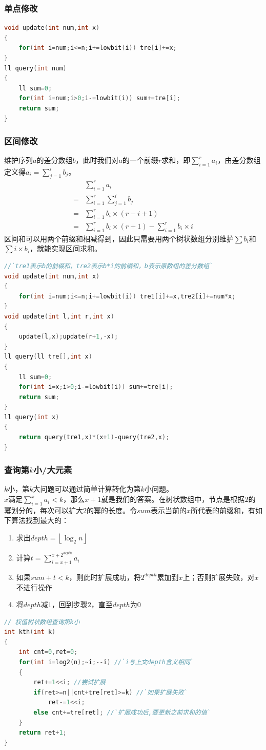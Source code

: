 \documentclass[a4paper]{book}
\begin{document}
\subsubsection{单点修改}
\begin{lstlisting}[language=c++]
void update(int num,int x)
{
    for(int i=num;i<=n;i+=lowbit(i)) tre[i]+=x;
}
ll query(int num)
{
    ll sum=0;
    for(int i=num;i>0;i-=lowbit(i)) sum+=tre[i];
    return sum;
}
\end{lstlisting}
\subsubsection{区间修改}
维护序列$a$的差分数组$b$，此时我们对$a$的一个前缀$r$求和，即$\sum_{i=1}^{r}a_i$，由差分数组定义得$a_i=\sum_{j=1}^{i}b_j$。
$$
\begin{aligned}
    &\sum_{i=1}^{r}a_i\\
    =&\sum_{i=1}^{r}\sum_{j=1}^{i}b_j\\
    =&\sum_{i=1}^{r}b_i\times(r-i+1)\\
    =&\sum_{i=1}^{r}b_i\times(r+1)-\sum_{i=1}^{r}b_i\times i
\end{aligned}
$$
区间和可以用两个前缀和相减得到，因此只需要用两个树状数组分别维护$\sum b_i$和$\sum i\times b_i$，就能实现区间求和。
\begin{lstlisting}[language=c++,escapeinside=``]
//`tre1表示b的前缀和，tre2表示b*i的前缀和，b表示原数组的差分数组`
void update(int num,int x)
{ 
    for(int i=num;i<=n;i+=lowbit(i)) tre1[i]+=x,tre2[i]+=num*x;
}
void update(int l,int r,int x)
{
    update(l,x);update(r+1,-x);
}
ll query(ll tre[],int x)
{
    ll sum=0;
    for(int i=x;i>0;i-=lowbit(i)) sum+=tre[i];
    return sum;
}
ll query(int x)
{
    return query(tre1,x)*(x+1)-query(tre2,x);
}
\end{lstlisting}
\subsubsection{查询第$k$小/大元素}
$k$小，第$k$大问题可以通过简单计算转化为第$k$小问题。\\
$x$满足$\sum_{i=1}^x a_i<k$，那么$x+1$就是我们的答案。在树状数组中，节点是根据$2$的幂划分的，每次可以扩大$2$的幂的长度。令$sum$表示当前的$x$所代表的前缀和，有如下算法找到最大的：
\begin{enumerate}
    \item 求出$depth=\left\lfloor\log_2n\right\rfloor$
    \item 计算$t=\displaystyle\sum_{i=x+1}^{x+2^{depth}} a_i$
    \item 如果$sum+t<k$，则此时扩展成功，将$2^{depth}$累加到$x$上；否则扩展失败，对$x$不进行操作
    \item 将$depth$减$1$，回到步骤$2$，直至$depth$为$0$
\end{enumerate}
\begin{lstlisting}[language=c++,escapeinside=``]
// 权值树状数组查询第k小
int kth(int k) 
{
    int cnt=0,ret=0;
    for(int i=log2(n);~i;--i) //`i与上文depth含义相同`
    {      
        ret+=1<<i; //尝试扩展
        if(ret>=n||cnt+tre[ret]>=k) //`如果扩展失败`
            ret-=1<<i;
        else cnt+=tre[ret]; //`扩展成功后,要更新之前求和的值`
    }
    return ret+1;
}
\end{lstlisting}
\end{document}
